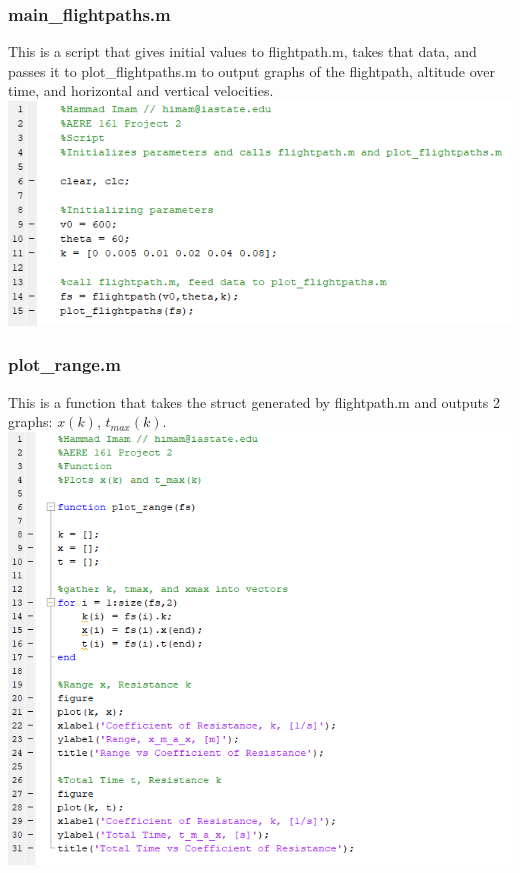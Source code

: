 \documentclass[oneside]{article}
\begin{document}
\subsubsection{main\_flightpaths.m}
This is a script that gives initial values to flightpath.m, takes that data, and passes it to plot\_flightpaths.m to output graphs of the flightpath, altitude over time, and horizontal and vertical velocities.\\
\includegraphics [width=\linewidth*4/5]{code_main_flightpaths.png}
\subsubsection{plot\_range.m}
This is a function that takes the struct generated by flightpath.m and outputs 2 graphs: $x(k)$, $t_{max}(k)$.\\
\includegraphics [width=\linewidth*4/5]{code_plot_range.png}
\newpage
\end{document}
